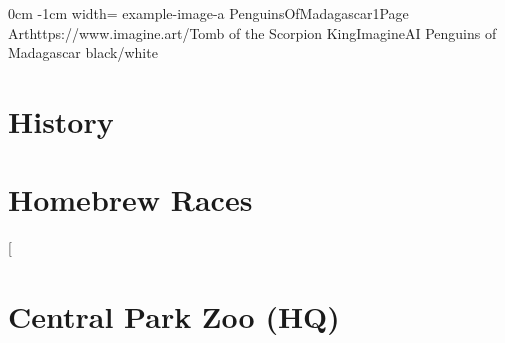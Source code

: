 \documentclass[letterpaper,openany,twoside,twocolumn]{book}
\begin{document}
	\DungeonSheetGeometry

%
	{0cm}%
	{-1cm}%
	{width=\paperwidth}%
	{example-image-a}%
	{%
		{PenguinsOfMadagascar1}{Page \thepage}{Art}{https://www.imagine.art/}{Tomb of the Scorpion King}{ImagineAI}%
	}%
	{Penguins of Madagascar}%
	{}%
	{black/white}%
	
	\clearpage
	\section*{History}
	
	\clearpage
	\section*{Homebrew Races}
	
	\clearpage
	\twocolumn[\section*{Central Park Zoo (HQ)}
\end{document}
